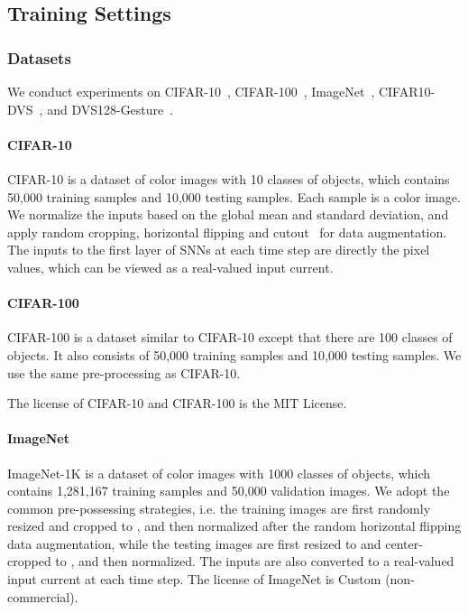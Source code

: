 \documentclass{article}
\begin{document}
\subsection{Training Settings}

\subsubsection{Datasets}

We conduct experiments on CIFAR-10~\cite{krizhevsky2009learning}, CIFAR-100~\cite{krizhevsky2009learning}, ImageNet~\cite{deng2009imagenet},  CIFAR10-DVS~\cite{li2017cifar10}, and DVS128-Gesture~\cite{amir2017low}.

\paragraph{CIFAR-10} CIFAR-10 is a dataset of color images with 10 classes of objects, which contains 50,000 training samples and 10,000 testing samples. Each sample is a  color image. We normalize the inputs based on the global mean and standard deviation, and apply random cropping, horizontal flipping and cutout~\cite{devries2017improved} for data augmentation. The inputs to the first layer of SNNs at each time step are directly the pixel values, which can be viewed as a real-valued input current.

\paragraph{CIFAR-100} CIFAR-100 is a dataset similar to CIFAR-10 except that there are 100 classes of objects. It also consists of 50,000 training samples and 10,000 testing samples. We use the same pre-processing as CIFAR-10.

The license of CIFAR-10 and CIFAR-100 is the MIT License. 

\paragraph{ImageNet} ImageNet-1K is a dataset of color images with 1000 classes of objects, which contains 1,281,167 training samples and 50,000 validation images. We adopt the common pre-possessing strategies, i.e. the training images are first randomly resized and cropped to , and then normalized after the random horizontal flipping data augmentation, while the testing images are first resized to  and center-cropped to , and then normalized. The inputs are also converted to a real-valued input current at each time step. The license of ImageNet is Custom (non-commercial).
\end{document}
